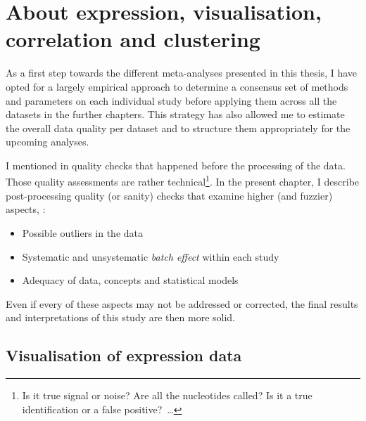 \chapter{About expression, visualisation, correlation and clustering}\label{ch:expression}

\setlength{\epigraphwidth}{0.58\textwidth}%
\setlength{\epigraphrule}{0pt}%

As a first step towards the different meta-analyses presented in this thesis,
I have opted for a largely empirical approach to determine
a consensus set of methods and parameters on each individual study
before applying them across all the datasets in the further chapters.
This strategy has also allowed me
to estimate the overall data quality per dataset
and to structure them appropriately for the upcoming analyses.\mybr\

I mentioned in  quality checks
that happened before the processing of the data.
Those quality assessments are rather technical\footnote{Is it true signal
or noise?
Are all the nucleotides called?
Is it a true identification or a false positive?~\ldots}.
In the present chapter, I describe post-processing quality (or sanity) checks
that examine higher (and fuzzier) aspects, \eg:\mybr\
\begin{itemize}[topsep=0pt,nosep]
    \item Possible outliers in the data
    \item Systematic and unsystematic \emph{batch effect} within each study
    \item Adequacy of data, concepts and statistical models
\end{itemize}
Even if every of these aspects may not be addressed or corrected,
the final results and interpretations of this study are then more solid.\mybr\

\section{Visualisation of expression data}

